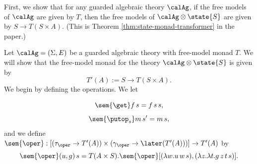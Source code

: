 
First, we show that for any guarded algebraic theory $\calAg$, if the free
models of $\calAg$ are given by $T$, then the free models of $\calAg \otimes
\state{S}$ are given by $S \to T(S \times A)$. (This is Theorem
\ref{thm:state-monad-transformer} in the paper.)

Let $\calAg = (\Sigma, E)$ be a guarded algebraic theory with free-model monad
$T$. We will show that the free-model monad for the theory $\calAg \otimes
\state{S}$ is given by
%
\[ T'(A) := S \to T(S \times A). \]
%
We begin by defining the operations. We let

\[ \sem{\get} f\, s = f\, s\, s, \]
%
\[ \sem{\putop_s} m\, s' = m\, s, \]  
%
and we define $\sem{\oper} : [(\tau_\oper \to T'(A)) \times (\gamma_\oper \to \later(T'(A)))] \to T'(A)$ by
%
\[ 
  \sem{\oper}(u, g)\, s = 
    T(A \times S).\sem{\oper}
      [(\lambda w. u\, w\, s), (\lambda z. \lambda t. g\, z\, t\, s)].
\]

